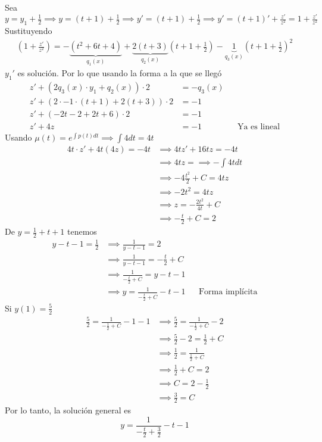 Sea $\displaystyle y=y_{1}+\frac{1}{2} \implies y=(t+1)+\frac{1}{2} \implies y' = (t+1)+\frac{1}{2} \implies y'=(t+1)'+\frac{z'}{z^{2}}= 1 + \frac{z'}{z^{2}}$
Sustituyendo
\begin{align*}
    \left( 1 + \frac{z'}{z^{2}}\right) = - \underbrace{(t^{2}+6t+4)}_{q_{1}(x)}+\underbrace{2(t+3)}_{q_{2}(x)}\left( t+1+\frac{1}{2} \right)-\underbrace{1}_{q_{3}(x)}\left( t+1+\frac{1}{2} \right)^{2}
\end{align*}
$y_{1}'$ es solución. Por lo que usando la forma a la que se llegó
\begin{align*}
    z'+(2q_{3}(x)\cdot y_{1}+q_{2}(x))\cdot 2 & = -q_{3}(x)\\
    z'+(2\cdot-1\cdot(t+1)+2(t+3))\cdot2&=-1\\
    z' +(-2t-2+2t+6)\cdot 2 &= -1\\
    z'+4z & = -1
    & & \text{Ya es lineal}
\end{align*}
Usando $\displaystyle \mu(t)=e^{\int p(t)dt} \implies \int 4 dt = 4t$
\begin{align*}
    4t\cdot z' + 4t(4z)=-4t & \implies 4tz'+16tz=-4t\\
    & \implies 4 tz = \implies - \int 4t dt\\
    & \implies -4 \frac{t^{2}}{2} + C = 4tz\\
    & \implies -2t^{2}=4tz\\
    & \implies z = -\frac{2t^{2}}{4t} + C\\
    & \implies - \frac{t}{2}+C = 2
\end{align*}
De $\displaystyle y=\frac{1}{2}+t+1$ tenemos
\begin{align*}
    y-t-1 = \frac{1}{2} &\implies \frac{1}{y-t-1}=2\\
    & \implies \frac{1}{y-t-1}= - \frac{t}{2}+ C\\
    & \implies \frac{1}{-\frac{t}{2}+ C}=y-t-1\\
    & \implies y = \frac{1}{-\frac{t}{2}+ C}-t-1
    & & \text{Forma implícita}
\end{align*}
Si $y(1)= \frac{5}{2}$
\begin{align*}
    \frac{5}{2}= \frac{1}{-\frac{1}{2}+ C}-1-1 & \implies \frac{5}{2}= \frac{1}{-\frac{1}{2}+ C}-2\\
    & \implies \frac{5}{2}-2 = \frac{1}{2} + C\\
    & \implies \frac{1}{2} = \frac{1}{\frac{1}{2}+C}\\
    & \implies \frac{1}{2}+ C = 2\\
    & \implies C = 2 - \frac{1}{2}\\
    & \implies \frac{3}{2}= C
\end{align*}
Por lo tanto, la solución general es
\begin{equation*}
    y = \frac{1}{-\frac{t}{2}+\frac{3}{2}} -t-1
\end{equation*}